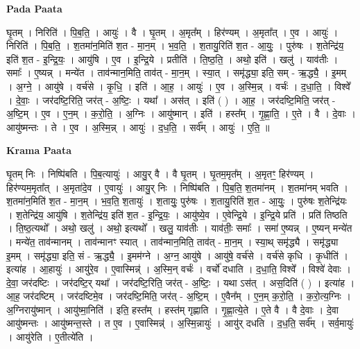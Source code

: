 \documentclass[17pt]{extarticle}
\begin{document}
\textbf{Pada Paata} \newline

घृ॒तम् । निरिति॑ । पि॒ब॒ति॒ । आयुः॑ । वै । घृ॒तम् । अ॒मृत᳚म् । हिर॑ण्यम् । अ॒मृता᳚त् । ए॒व । आयुः॑ । निरिति॑ । पि॒ब॒ति॒ । श॒तमा॑न॒मिति॑ श॒त - मा॒न॒म् । भ॒व॒ति॒ । श॒तायु॒रिति॑ श॒त - आ॒युः॒ । पुरु॑षः । श॒तेन्द्रि॑य॒ इति॑ श॒त - इ॒न्द्रि॒यः॒ । आयु॑षि । ए॒व । इ॒न्द्रि॒ये । प्रतीति॑ । ति॒ष्ठ॒ति॒ । अथो॒ इति॑ । खलु॑ । याव॑तीः । समाः᳚ । ए॒ष्यन्न् । मन्ये॑त । ताव॑न्मान॒मिति॒ ताव॑त् - मा॒न॒म् । स्या॒त् । समृ॑द्ध्या॒ इति॒ सम् - ऋ॒द्ध्यै॒ । इ॒मम् । अ॒ग्ने॒ । आयु॑षे । वर्च॑से । कृ॒धि॒ । इति॑ । आ॒ह॒ । आयुः॑ । ए॒व । अ॒स्मि॒न्न् । वर्चः॑ । द॒धा॒ति॒ । विश्वे᳚ । दे॒वाः॒ । जर॑दष्टि॒रिति॒ जर॑त् - अ॒ष्टिः॒ । यथा᳚ । अस॑त् । इति॑ ( ) । आ॒ह॒ । जर॑दष्टि॒मिति॒ जर॑त् - अ॒ष्टि॒म् । ए॒व । ए॒न॒म् । क॒रो॒ति॒ । अ॒ग्निः । आयु॑ष्मान् । इति॑ । हस्त᳚म् । गृ॒ह्णा॒ति॒ । ए॒ते । वै । दे॒वाः । आयु॑ष्मन्तः । ते । ए॒व । अ॒स्मि॒न्न् । आयुः॑ । द॒ध॒ति॒ । सर्व᳚म् । आयुः॑ । ए॒ति॒ ॥  \newline


\textbf{Krama Paata} \newline

घृ॒तम् निः । निष्पि॑बति । पि॒ब॒त्यायुः॑ । आयु॒र् वै । वै घृ॒तम् । घृ॒तम॒मृत᳚म् । अ॒मृतꣳ॒॒ हिर॑ण्यम् । हिर॑ण्यम॒मृता᳚त् । अ॒मृता॑दे॒व । ए॒वायुः॑ । आयु॒र् निः । निष्पि॑बति । पि॒ब॒ति॒ श॒तमा॑नम् । श॒तमा॑नम् भवति । श॒तमा॑न॒मिति॑ श॒त - मा॒न॒म् । भ॒व॒ति॒ श॒तायुः॑ । श॒तायुः॒ पुरु॑षः । श॒तायु॒रिति॑ श॒त - आ॒युः॒ । पुरु॑षः श॒तेन्द्रि॑यः । श॒तेन्द्रि॑य॒ आयु॑षि । श॒तेन्द्रि॑य॒ इति॑ श॒त - इ॒न्द्रि॒यः॒ । आयु॑ष्ये॒व । ए॒वेन्द्रि॒ये । इ॒न्द्रि॒ये प्रति॑ । प्रति॑ तिष्ठति । ति॒ष्ठ॒त्यथो᳚ । अथो॒ खलु॑ । अथो॒ इत्यथो᳚ । खलु॒ याव॑तीः । याव॑तीः॒ समाः᳚ । समा॑ ए॒ष्यन्न् । ए॒ष्यन् मन्ये॑त । मन्ये॑त॒ ताव॑न्मानम् । ताव॑न्मानꣳ स्यात् । ताव॑न्मान॒मिति॒ ताव॑त् - मा॒न॒म् । स्या॒थ् समृ॑द्ध्यै । समृ॑द्ध्या इ॒मम् । समृ॑द्ध्या॒ इति॒ सं - ऋ॒द्ध्यै॒ । इ॒मम॑ग्ने । अ॒ग्न॒ आयु॑षे । आयु॑षे॒ वर्च॑से । वर्च॑से कृधि । कृ॒धीति॑ । इत्या॑ह । आ॒हायुः॑ । आयु॑रे॒व । ए॒वास्मिन्न्॑ । अ॒स्मि॒न् वर्चः॑ । वर्चो॑ दधाति । द॒धा॒ति॒ विश्वे᳚ । विश्वे॑ देवाः । दे॒वा॒ जर॑दष्टिः । जर॑दष्टि॒र् यथा᳚ । जर॑दष्टि॒रिति॒ जर॑त् - अ॒ष्टिः॒ । यथा ऽस॑त् । अस॒दिति॑ ( ) । इत्या॑ह । आ॒ह॒ जर॑दष्टिम् । जर॑दष्टिमे॒व । जर॑दष्टि॒मिति॒ जर॑त् - अ॒ष्टि॒म् । ए॒वैन᳚म् । ए॒न॒म् क॒रो॒ति॒ । क॒रो॒त्य॒ग्निः । अ॒ग्निरायु॑ष्मान् । आयु॑ष्मा॒निति॑ । इति॒ हस्त᳚म् । हस्त॑म् गृह्णाति । गृ॒ह्णा॒त्ये॒ते । ए॒ते वै । वै दे॒वाः । दे॒वा आयु॑ष्मन्तः । आयु॑ष्मन्त॒स्ते । त ए॒व । ए॒वास्मिन्न्॑ । अ॒स्मि॒न्नायुः॑ । आयु॑र् दधति । द॒ध॒ति॒ सर्व᳚म् । सर्व॒मायुः॑ । आयु॑रेति । ए॒तीत्ये॑ति । \newline
\end{document}
